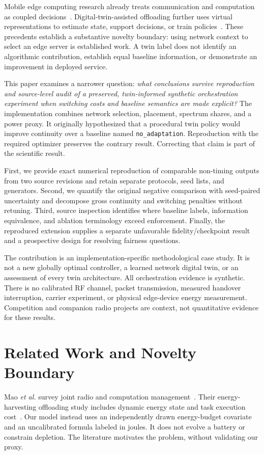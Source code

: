 \documentclass[letterpaper,journal]{IEEEtran}
\newcommand{\pol}[1]{\texttt{#1}}
\begin{document}
Mobile edge computing research already treats communication and computation as coupled decisions~\cite{mao2017survey}. Digital-twin-assisted offloading further uses virtual representations to estimate state, support decisions, or train policies~\cite{sun2020latency,dai2021stochastic,doduy2022offloading}. These precedents establish a substantive novelty boundary: using network context to select an edge server is established work. A twin label does not identify an algorithmic contribution, establish equal baseline information, or demonstrate an improvement in deployed service.

This paper examines a narrower question: \emph{what conclusions survive reproduction and source-level audit of a preserved, twin-informed synthetic orchestration experiment when switching costs and baseline semantics are made explicit?} The implementation combines network selection, placement, spectrum shares, and a power proxy. It originally hypothesized that a procedural twin policy would improve continuity over a baseline named \pol{no\_adaptation}. Reproduction with the required optimizer preserves the contrary result. Correcting that claim is part of the scientific result.

First, we provide exact numerical reproduction of comparable non-timing outputs from two source revisions and retain separate protocols, seed lists, and generators. Second, we quantify the original negative comparison with seed-paired uncertainty and decompose gross continuity and switching penalties without retuning. Third, source inspection identifies where baseline labels, information equivalence, and ablation terminology exceed enforcement. Finally, the reproduced extension supplies a separate unfavorable fidelity/checkpoint result and a prospective design for resolving fairness questions.

The contribution is an implementation-specific methodological case study. It is not a new globally optimal controller, a learned network digital twin, or an assessment of every twin architecture. All orchestration evidence is synthetic. There is no calibrated RF channel, packet transmission, measured handover interruption, carrier experiment, or physical edge-device energy measurement. Competition and companion radio projects are context, not quantitative evidence for these results.

\section{Related Work and Novelty Boundary}
Mao \emph{et al.} survey joint radio and computation management~\cite{mao2017survey}. Their energy-harvesting offloading study includes dynamic energy state and task execution cost~\cite{mao2016dynamic}. Our model instead uses an independently drawn energy-budget covariate and an uncalibrated formula labeled in joules. It does not evolve a battery or constrain depletion. The literature motivates the problem, without validating our proxy.
\end{document}
